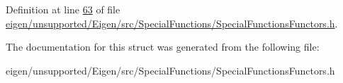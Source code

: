 Definition at line \hyperlink{eigen_2unsupported_2_eigen_2src_2_special_functions_2_special_functions_functors_8h_source_l00063}{63} of file \hyperlink{eigen_2unsupported_2_eigen_2src_2_special_functions_2_special_functions_functors_8h_source}{eigen/unsupported/\+Eigen/src/\+Special\+Functions/\+Special\+Functions\+Functors.\+h}.



The documentation for this struct was generated from the following file\+:\begin{DoxyCompactItemize}
\item 
eigen/unsupported/\+Eigen/src/\+Special\+Functions/\+Special\+Functions\+Functors.\+h\end{DoxyCompactItemize}
